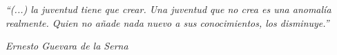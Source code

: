 \textit{“(...) la juventud tiene que crear. Una juventud que no crea es una anomalía realmente. Quien no añade nada nuevo a sus conocimientos, los disminuye.”}
\\
\begin{flushright}
\textit{Ernesto Guevara de la Serna}
\end{flushright}